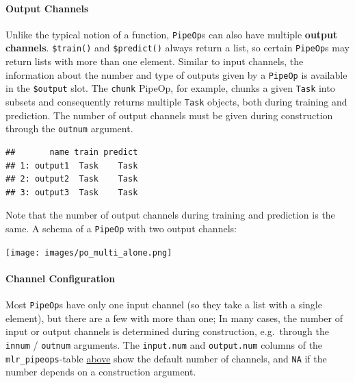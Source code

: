 \documentclass[]{article}
\newenvironment{Shaded}{\begin{snugshade}}{\end{snugshade}}
\newcommand{\DataTypeTok}[1]{\textcolor[rgb]{0.13,0.29,0.53}{#1}}
\newcommand{\DecValTok}[1]{\textcolor[rgb]{0.00,0.00,0.81}{#1}}
\newcommand{\KeywordTok}[1]{\textcolor[rgb]{0.13,0.29,0.53}{\textbf{#1}}}
\newcommand{\NormalTok}[1]{#1}
\newcommand{\OperatorTok}[1]{\textcolor[rgb]{0.81,0.36,0.00}{\textbf{#1}}}
\newcommand{\StringTok}[1]{\textcolor[rgb]{0.31,0.60,0.02}{#1}}
\let\oldparagraph\paragraph
\renewcommand{\paragraph}[1]{\oldparagraph{#1}\mbox{}}
\renewenvironment{Shaded} {\begin{snugshade}\small} {\end{snugshade}}
\begin{document}
\hypertarget{output-channels}{%
\paragraph{Output Channels}\label{output-channels}}

Unlike the typical notion of a function, \texttt{PipeOp}s can also have multiple \textbf{output channels}.
\texttt{\$train()} and \texttt{\$predict()} always return a list, so certain \texttt{PipeOp}s may return lists with more than one element.
Similar to input channels, the information about the number and type of outputs given by a \texttt{PipeOp} is available in the \texttt{\$output} slot.
The \texttt{chunk} PipeOp, for example, chunks a given \texttt{Task} into subsets and consequently returns multiple \texttt{Task} objects, both during training and prediction.
The number of output channels must be given during construction through the \texttt{outnum} argument.

\begin{Shaded}
\end{Shaded}

\begin{verbatim}
##       name train predict
## 1: output1  Task    Task
## 2: output2  Task    Task
## 3: output3  Task    Task
\end{verbatim}

Note that the number of output channels during training and prediction is the same.
A schema of a \texttt{PipeOp} with two output channels:

\texttt{[image: images/po\_multi\_alone.png]}

\hypertarget{channel-configuration}{%
\paragraph{Channel Configuration}\label{channel-configuration}}

Most \texttt{PipeOp}s have only one input channel (so they take a list with a single element), but there are a few with more than one;
In many cases, the number of input or output channels is determined during construction, e.g.~through the \texttt{innum} / \texttt{outnum} arguments.
The \texttt{input.num} and \texttt{output.num} columns of the \texttt{mlr\_pipeops}-table \protect\hyperlink{where-to-get-pipeops}{above} show the default number of channels, and \texttt{NA} if the number depends on a construction argument.
\end{document}
